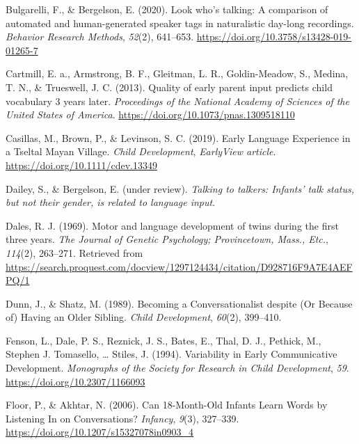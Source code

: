 \documentclass[
  english,
  man,floatsintext]{apa6}
\newlength{\cslhangindent}
\newlength{\cslentryspacingunit} %
\newenvironment{CSLReferences}[2] %
 {%
  \setlength{\parindent}{0pt}
  \ifodd #1
  \let\oldpar\par
  \def\par{\hangindent=\cslhangindent\oldpar}
  \fi
  \setlength{\parskip}{#2\cslentryspacingunit}
 }%
 {}
\begin{document}
\begin{CSLReferences}{1}{0}
\leavevmode{}%
Bulgarelli, F., \& Bergelson, E. (2020). Look who's talking: {A} comparison of automated and human-generated speaker tags in naturalistic day-long recordings. \emph{Behavior Research Methods}, \emph{52}(2), 641--653. \url{https://doi.org/10.3758/s13428-019-01265-7}

\leavevmode{}%
Cartmill, E. a., Armstrong, B. F., Gleitman, L. R., Goldin-Meadow, S., Medina, T. N., \& Trueswell, J. C. (2013). Quality of early parent input predicts child vocabulary 3 years later. \emph{Proceedings of the National Academy of Sciences of the United States of America}. \url{https://doi.org/10.1073/pnas.1309518110}

\leavevmode{}%
Casillas, M., Brown, P., \& Levinson, S. C. (2019). Early {Language} {Experience} in a {Tseltal} {Mayan} {Village}. \emph{Child Development}, \emph{EarlyView article}. \url{https://doi.org/10.1111/cdev.13349}

\leavevmode{}%
Dailey, S., \& Bergelson, E. (under review). \emph{Talking to talkers: {Infants}' talk status, but not their gender, is related to language input}.

\leavevmode{}%
Dales, R. J. (1969). Motor and language development of twins during the first three years. \emph{The Journal of Genetic Psychology; Provincetown, Mass., Etc.}, \emph{114}(2), 263--271. Retrieved from \url{https://search.proquest.com/docview/1297124434/citation/D928716F9A7E4AEFPQ/1}

\leavevmode{}%
Dunn, J., \& Shatz, M. (1989). Becoming a {Conversationalist} despite ({Or} {Because} of) {Having} an {Older} {Sibling}. \emph{Child Development}, \emph{60}(2), 399--410.

\leavevmode{}%
Fenson, L., Dale, P. S., Reznick, J. S., Bates, E., Thal, D. J., Pethick, M., Stephen J. Tomasello, \ldots{} Stiles, J. (1994). Variability in {Early} {Communicative} {Development}. \emph{Monographs of the Society for Research in Child Development}, \emph{59}. \url{https://doi.org/10.2307/1166093}

\leavevmode{}%
Floor, P., \& Akhtar, N. (2006). Can 18-{Month}-{Old} {Infants} {Learn} {Words} by {Listening} {In} on {Conversations}? \emph{Infancy}, \emph{9}(3), 327--339. \url{https://doi.org/10.1207/s15327078in0903_4}


\end{CSLReferences}
\end{document}

